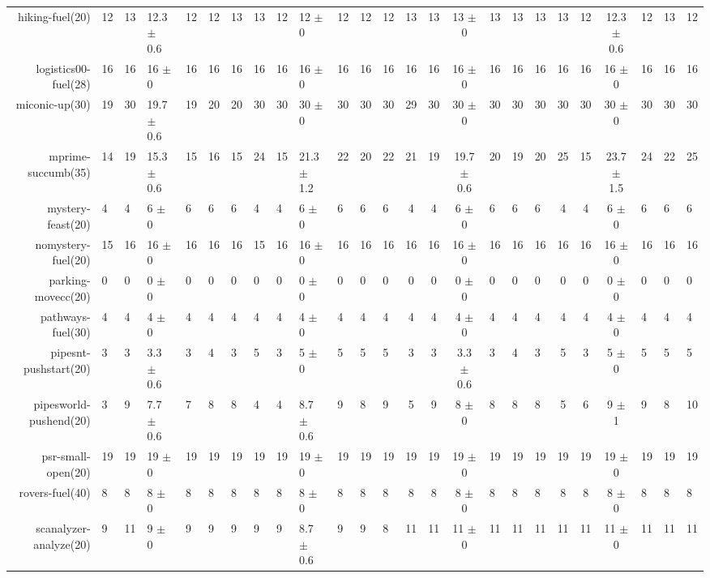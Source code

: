 \begin{center}
\begin{tabular}{|rHHHHHHHHHHHHcccHHH|cccHHH|}
hiking-fuel(20) & 12 & 13 & 12.3 $\pm$ 0.6 & 12 & 12 & 13 & 13 & 12 & 12 $\pm$ 0 & 12 & 12 & 12 & 13 & 13 & 13 $\pm$ 0 & 13 & 13 & 13 & 13 & 12 & 12.3 $\pm$ 0.6 & 12 & 13 & 12\\
logistics00-fuel(28) & 16 & 16 & 16 $\pm$ 0 & 16 & 16 & 16 & 16 & 16 & 16 $\pm$ 0 & 16 & 16 & 16 & 16 & 16 & 16 $\pm$ 0 & 16 & 16 & 16 & 16 & 16 & 16 $\pm$ 0 & 16 & 16 & 16\\
miconic-up(30) & 19 & 30 & 19.7 $\pm$ 0.6 & 19 & 20 & 20 & 30 & 30 & 30 $\pm$ 0 & 30 & 30 & 30 & 29 & 30 & 30 $\pm$ 0 & 30 & 30 & 30 & 30 & 30 & 30 $\pm$ 0 & 30 & 30 & 30\\
mprime-succumb(35) & 14 & 19 & 15.3 $\pm$ 0.6 & 15 & 16 & 15 & 24 & 15 & 21.3 $\pm$ 1.2 & 22 & 20 & 22 & 21 & 19 & 19.7 $\pm$ 0.6 & 20 & 19 & 20 & 25 & 15 & 23.7 $\pm$ 1.5 & 24 & 22 & 25\\
mystery-feast(20) & 4 & 4 & 6 $\pm$ 0 & 6 & 6 & 6 & 4 & 4 & 6 $\pm$ 0 & 6 & 6 & 6 & 4 & 4 & 6 $\pm$ 0 & 6 & 6 & 6 & 4 & 4 & 6 $\pm$ 0 & 6 & 6 & 6\\
nomystery-fuel(20) & 15 & 16 & 16 $\pm$ 0 & 16 & 16 & 16 & 15 & 16 & 16 $\pm$ 0 & 16 & 16 & 16 & 16 & 16 & 16 $\pm$ 0 & 16 & 16 & 16 & 16 & 16 & 16 $\pm$ 0 & 16 & 16 & 16\\
parking-movecc(20) & 0 & 0 & 0 $\pm$ 0 & 0 & 0 & 0 & 0 & 0 & 0 $\pm$ 0 & 0 & 0 & 0 & 0 & 0 & 0 $\pm$ 0 & 0 & 0 & 0 & 0 & 0 & 0 $\pm$ 0 & 0 & 0 & 0\\
pathways-fuel(30) & 4 & 4 & 4 $\pm$ 0 & 4 & 4 & 4 & 4 & 4 & 4 $\pm$ 0 & 4 & 4 & 4 & 4 & 4 & 4 $\pm$ 0 & 4 & 4 & 4 & 4 & 4 & 4 $\pm$ 0 & 4 & 4 & 4\\
pipesnt-pushstart(20) & 3 & 3 & 3.3 $\pm$ 0.6 & 3 & 4 & 3 & 5 & 3 & 5 $\pm$ 0 & 5 & 5 & 5 & 3 & 3 & 3.3 $\pm$ 0.6 & 3 & 4 & 3 & 5 & 3 & 5 $\pm$ 0 & 5 & 5 & 5\\
pipesworld-pushend(20) & 3 & 9 & 7.7 $\pm$ 0.6 & 7 & 8 & 8 & 4 & 4 & 8.7 $\pm$ 0.6 & 9 & 8 & 9 & 5 & 9 & 8 $\pm$ 0 & 8 & 8 & 8 & 5 & 6 & 9 $\pm$ 1 & 9 & 8 & 10\\
psr-small-open(20) & 19 & 19 & 19 $\pm$ 0 & 19 & 19 & 19 & 19 & 19 & 19 $\pm$ 0 & 19 & 19 & 19 & 19 & 19 & 19 $\pm$ 0 & 19 & 19 & 19 & 19 & 19 & 19 $\pm$ 0 & 19 & 19 & 19\\
rovers-fuel(40) & 8 & 8 & 8 $\pm$ 0 & 8 & 8 & 8 & 8 & 8 & 8 $\pm$ 0 & 8 & 8 & 8 & 8 & 8 & 8 $\pm$ 0 & 8 & 8 & 8 & 8 & 8 & 8 $\pm$ 0 & 8 & 8 & 8\\
scanalyzer-analyze(20) & 9 & 11 & 9 $\pm$ 0 & 9 & 9 & 9 & 9 & 9 & 8.7 $\pm$ 0.6 & 9 & 9 & 8 & 11 & 11 & 11 $\pm$ 0 & 11 & 11 & 11 & 11 & 11 & 11 $\pm$ 0 & 11 & 11 & 11\\

\end{tabular}
\end{center}
